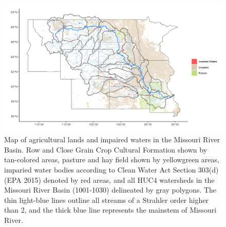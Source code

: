 \documentclass[12pt,]{article}
\makeatletter
\def\maxwidth{\ifdim\Gin@nat@width>\linewidth\linewidth\else\Gin@nat@width\fi}
\makeatother
\begin{document}
\begin{figure}[H]
\includegraphics[width=\maxwidth]{../Figures/cropland3} \caption{\label{fig:cropland} Map of agricultural lands and impaired waters in the Missouri River Basin. Row and Close Grain Crop Cultural Formation shown by tan-colored areas, pasture and hay field shown by yellowgreen areas, imparied water bodies according to Clean Water Act Section 303(d) (EPA 2015) denoted by red areas, and all HUC4 watersheds in the Missouri River Basin (1001-1030) delineated by gray polygons. The thin light-blue lines outline all streams of a Strahler order higher than 2, and the thick blue line represents the mainstem of Missouri River.}\label{fig:cropland}
\end{figure}
\end{document}
